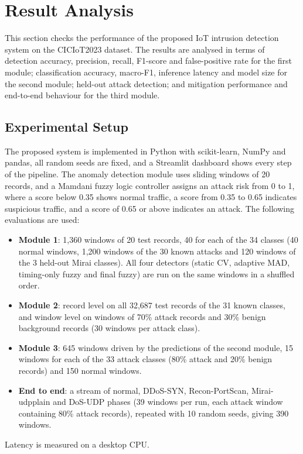 \documentclass[]{interact}
\theoremstyle{plain}%
\theoremstyle{definition}
\theoremstyle{remark}
\begin{document}
\section{Result Analysis}
This section checks the performance of the proposed IoT intrusion detection system on the CICIoT2023 dataset. The results are analysed in terms of detection accuracy, precision, recall, F1-score and false-positive rate for the first module; classification accuracy, macro-F1, inference latency and model size for the second module; held-out attack detection; and mitigation performance and end-to-end behaviour for the third module.

\subsection{Experimental Setup}\label{sec:setup}
The proposed system is implemented in Python with scikit-learn, NumPy and pandas, all random seeds are fixed, and a Streamlit dashboard shows every step of the pipeline. The anomaly detection module uses sliding windows of 20 records, and a Mamdani fuzzy logic controller assigns an attack risk from 0 to 1, where a score below 0.35 shows normal traffic, a score from 0.35 to 0.65 indicates suspicious traffic, and a score of 0.65 or above indicates an attack. The following evaluations are used:
\begin{itemize}
\item \textbf{Module 1}: 1,360 windows of 20 test records, 40 for each of the 34 classes (40 normal windows, 1,200 windows of the 30 known attacks and 120 windows of the 3 held-out Mirai classes). All four detectors (static CV, adaptive MAD, timing-only fuzzy and final fuzzy) are run on the same windows in a shuffled order.
\item \textbf{Module 2}: record level on all 32,687 test records of the 31 known classes, and window level on windows of 70\% attack records and 30\% benign background records (30 windows per attack class).
\item \textbf{Module 3}: 645 windows driven by the predictions of the second module, 15 windows for each of the 33 attack classes (80\% attack and 20\% benign records) and 150 normal windows.
\item \textbf{End to end}: a stream of normal, DDoS-SYN, Recon-PortScan, Mirai-udpplain and DoS-UDP phases (39 windows per run, each attack window containing 80\% attack records), repeated with 10 random seeds, giving 390 windows.
\end{itemize}
Latency is measured on a desktop CPU.
\end{document}
